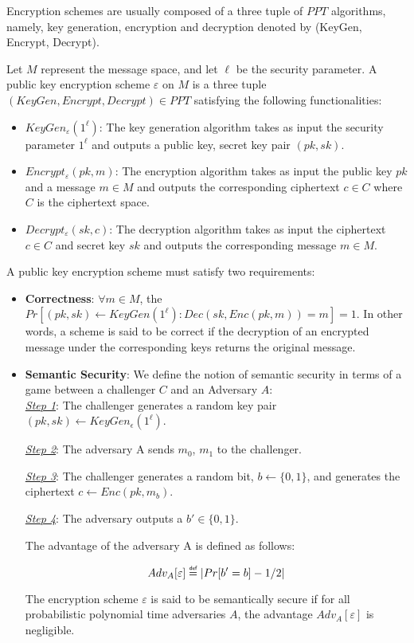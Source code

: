 \documentclass[../../main.tex]{subfiles}
\begin{document}
Encryption schemes are usually composed of a three tuple of $PPT$ algorithms, namely, key generation, encryption and decryption denoted by (KeyGen, Encrypt, Decrypt).

\begin{defn}
Let $M$ represent the message space, and let $\ell$ be the security parameter. A public key encryption scheme $\varepsilon$ on $M$ is a three tuple $(KeyGen, Encrypt, Decrypt) \in PPT$ satisfying the following functionalities:

\begin{itemize}
    \item $KeyGen_\varepsilon(1^\ell)$: The key generation algorithm takes as input the security parameter $1^\ell$ and outputs a public key, secret key pair $(pk,sk)$.
    \item $Encrypt_\varepsilon(pk,m)$: The encryption algorithm takes as input the public key $pk$ and a message $m \in M$ and outputs the corresponding ciphertext $c \in C$ where $C$ is the ciphertext space. 
    \item $Decrypt_\varepsilon(sk,c)$: The decryption algorithm takes as input the ciphertext $c \in C$ and secret key $sk$ and outputs the corresponding message $m \in M$.
\end{itemize}

\end{defn}

\noindent A public key encryption scheme must satisfy two requirements:

\begin{itemize}
    \item \textbf{Correctness}: $\forall m \in M$, the $Pr[(pk,sk) \leftarrow KeyGen(1^\ell): Dec(sk, Enc(pk,m))=m]=1$. In other words, a scheme is said to be correct if the decryption of an encrypted message under the corresponding keys returns the original message.
    \item \textbf{Semantic Security}: We define the notion of semantic security in terms of a game between a challenger $C$ and an Adversary $A$:\\
    \textit{\underline{Step 1}}: The challenger generates a random key pair $(pk,sk) \leftarrow KeyGen_\epsilon(1^\ell)$.
    
    \textit{\underline{Step 2}}: The adversary A sends $m_0$, $m_1$ to the challenger. 
    
    \textit{\underline{Step 3}}: The challenger generates a random bit, $b \leftarrow \{0,1\}$, and generates the ciphertext $c \leftarrow Enc(pk,m_b)$. 
    
    \textit{\underline{Step 4}}: The adversary outputs a $b' \in \{0,1\}$.

\noindent The advantage of the adversary A is
defined as follows:

\begin{equation*}
    Adv_A[\varepsilon] \myeq |Pr[b'=b]-1/2|
\end{equation*}

The encryption scheme $\varepsilon$ is said to be semantically secure if for all probabilistic polynomial
time adversaries $A$, the advantage $Adv_A[\varepsilon]$ is negligible.
\end{itemize}
\end{document}
